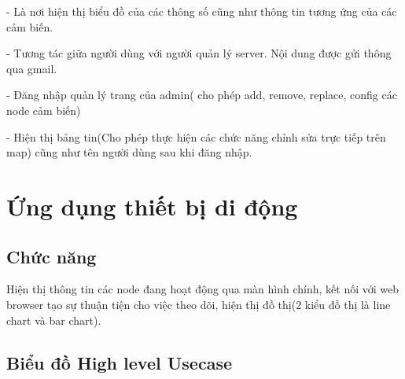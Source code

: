 -	Là nơi hiện thị biểu đồ của các thông số cũng như thông tin tương ứng của các cảm biến.


-	Tương tác giữa người dùng với người quản lý server. Nội dung được gửi thông qua gmail.



-	Đăng nhập quản lý trang của admin( cho phép add, remove, replace, config các node cảm biến)



-	Hiện thị bảng tin(Cho phép thực hiện các chức năng chỉnh sửa trực tiếp trên map) cũng như tên người dùng sau khi đăng nhập.














\section{Ứng dụng thiết bị di động}

\subsection*{Chức năng}
Hiện thị thông tin các node đang hoạt động qua màn hình chính, kết nối với web browser tạo sự thuận tiện cho việc theo dõi, hiện thị đồ thị(2 kiểu đồ thị là line chart và bar chart).

\subsection*{Biểu đồ High level Usecase }
